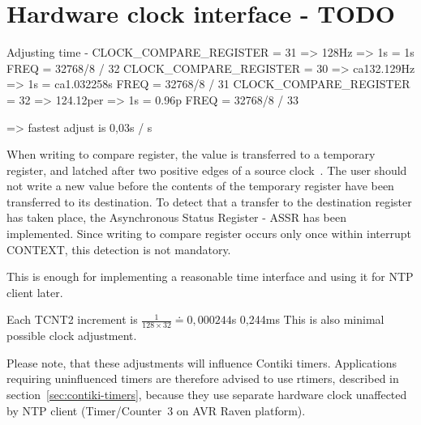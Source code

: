 
\section{Hardware clock interface - TODO}

Adjusting time - CLOCK\_COMPARE\_REGISTER = 31 => 128Hz => 1s = 1s
FREQ = 32768/8 / 32
CLOCK\_COMPARE\_REGISTER = 30 => ca132.129Hz => 1s = ca1.032258s
FREQ = 32768/8 / 31
CLOCK\_COMPARE\_REGISTER = 32 => 124.12per => 1s = 0.96p
FREQ = 32768/8 / 33

=> fastest adjust is 0,03s / s

When writing to compare register, the value is transferred to a
temporary register, and latched after two positive edges of a source clock~\cite{avr-datasheet}.
The user should not write a new value before the contents
of the temporary register have been transferred to its destination.
To detect that a transfer to the destination register has taken place,
the Asynchronous Status Register - ASSR has been implemented.
Since writing to compare register occurs only once within interrupt CONTEXT, %
this detection is not mandatory.



This is enough for implementing a reasonable time interface and using it for NTP client later.



Each TCNT2 increment is $\frac{1}{128 \times 32} \doteq 0,000244$s
0,244ms
This is also minimal possible clock adjustment.


Please note, that these adjustments will influence Contiki timers.
Applications requiring uninfluenced timers
are therefore advised to use rtimers, described in section~\ref{sec:contiki-timers},
because they use separate hardware clock unaffected by NTP client
(Timer/Counter~3 on AVR Raven platform).
